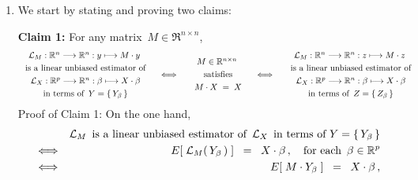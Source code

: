 \proof
\begin{enumerate}
\item
	We start by stating and proving two claims:

	\vskip 0.3cm
	\noindent
	\textbf{Claim 1:}\quad
	For any matrix \,$M \in \Re^{n \times n}$,\,
	\begin{equation*}
		\begin{array}{c}
		\mathcal{L}_{M} : \Re^{n} \longrightarrow \Re^{n} : y \longmapsto M \cdot y
		\\{\color{white}\overset{.}{\vert}}
		\textnormal{is a linear unbiased estimator of}
		\\{\color{white}\overset{.}{\vert}}
		\mathcal{L}_{X} : \Re^{p} \longrightarrow \Re^{n} : \beta \longmapsto X \cdot \beta
		\\{\color{white}\overset{.}{\vert}}
		\textnormal{in terms of \,$Y = \{\,Y_{\beta}\,\}$}
		\end{array}
	\quad\Longleftrightarrow\quad
		\begin{array}{c}
		\textnormal{$M \in \Re^{n \times n}$}
		\\{\color{white}\overset{.}{\vert}}
		\textnormal{satisfies}
		\\{\color{white}\overset{.}{\vert}}
		M \cdot X \; = \; X
		\end{array}
	\quad\Longleftrightarrow\quad
		\begin{array}{c}
		\mathcal{L}_{M} : \Re^{n} \longrightarrow \Re^{n} : z \longmapsto M \cdot z
		\\{\color{white}\overset{.}{\vert}}
		\textnormal{is a linear unbiased estimator of}
		\\{\color{white}\overset{.}{\vert}}
		\mathcal{L}_{X} : \Re^{p} \longrightarrow \Re^{n} : \beta \longmapsto X \cdot \beta
		\\{\color{white}\overset{.}{\vert}}
		\textnormal{in terms of \,$Z = \{\,Z_{\beta}\,\}$}
		\end{array}
	\end{equation*}
	\vskip 0.0cm
	Proof of Claim 1:
	On the one hand,
	\begin{eqnarray*}
	&&
		\textnormal{$\mathcal{L}_{M}$\, is a linear unbiased estimator of \,$\mathcal{L}_{X}$\,
		in terms of $Y = \{\,Y_{\beta}\,\}$}
	\\
	&\Longleftrightarrow&
		E\!\left[\;\mathcal{L}_{M}(\,Y_{\beta}\,)\;\right] \;\;=\;\; X \cdot \beta\,,
		\quad\textnormal{for each \,$\beta\in\Re^{p}$}
	\\
	&\Longleftrightarrow&
		E\!\left[\; M \cdot Y_{\beta} \;\right] \;\;=\;\; X \cdot \beta\,,

\end{eqnarray*}
\end{enumerate}

